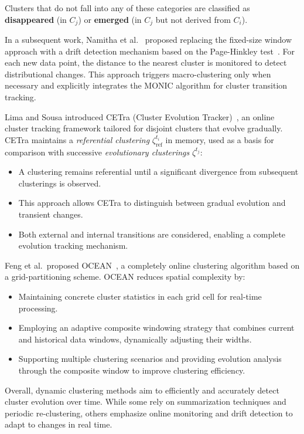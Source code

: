 Clusters that do not fall into any of these categories are classified as
\textbf{disappeared} (in $C_j$) or \textbf{emerged} (in $C_j$ but not derived
from $C_i$).

In a subsequent work, Namitha et al.~\cite{namitha_dynamic_clustering_2}
proposed replacing the fixed-size window approach with a drift detection
mechanism based on the Page-Hinkley test~\cite{page_hinkley}. For each new data point, the distance
to the nearest cluster is monitored to detect distributional changes. This
approach triggers macro-clustering only when necessary and explicitly
integrates the MONIC algorithm for cluster transition tracking.

Lima and Sousa introduced CETra (Cluster Evolution Tracker)~\cite{cetra}, an
online cluster tracking framework tailored for disjoint clusters that evolve
gradually. CETra maintains a \textit{referential clustering}
$\zeta_{\text{ref}}^{t_i}$ in memory, used as a basis for comparison with
successive \textit{evolutionary clusterings} $\zeta^{t_j}$:

\begin{itemize}
    \item A clustering remains referential until a significant divergence from subsequent
          clusterings is observed.
    \item This approach allows CETra to distinguish between gradual evolution and
          transient changes.
    \item Both external and internal transitions are considered, enabling a complete
          evolution tracking mechanism.
\end{itemize}

Feng et al.\ proposed OCEAN~\cite{ocean}, a completely online clustering
algorithm based on a grid-partitioning scheme. OCEAN reduces spatial complexity
by:

\begin{itemize}
    \item Maintaining concrete cluster statistics in each grid cell for real-time
          processing.
    \item Employing an adaptive composite windowing strategy that combines current and
          historical data windows, dynamically adjusting their widths.
    \item Supporting multiple clustering scenarios and providing evolution analysis
          through the composite window to improve clustering efficiency.
\end{itemize}

Overall, dynamic clustering methods aim to efficiently and accurately detect
cluster evolution over time. While some rely on summarization techniques and
periodic re-clustering, others emphasize online monitoring and drift detection
to adapt to changes in real time.